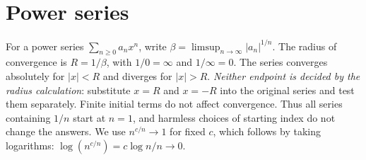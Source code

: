 \section{Power series}
For a power series $\sum_{n\ge0}a_nx^n$, write
$\beta=\limsup_{n\to\infty}|a_n|^{1/n}$. The radius of convergence is
$R=1/\beta$, with $1/0=\infty$ and $1/\infty=0$. The series converges
absolutely for $|x|<R$ and diverges for $|x|>R$. \emph{Neither endpoint
is decided by the radius calculation}: substitute $x=R$ and $x=-R$
into the original series and test them separately. Finite initial terms
do not affect convergence. Thus all series containing $1/n$ start at
$n=1$, and harmless choices of starting index do not change the answers.
We use $n^{c/n}\to1$ for fixed $c$, which follows by taking logarithms:
$\log(n^{c/n})=c\log n/n\to0$.

